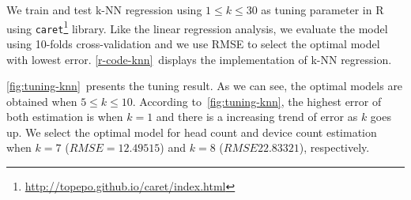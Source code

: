 	We train and test \ac{k-NN} regression using $1 \le k \le 30$ as tuning parameter in R using \verb|caret|\footnote{\url{http://topepo.github.io/caret/index.html}} library. Like the linear regression analysis, we evaluate the model using 10-folds cross-validation and we use \ac{RMSE} to select the optimal model with lowest error. \autoref{r-code-knn}~displays the implementation of \ac{k-NN} regression.

	\autoref{fig:tuning-knn}~presents the tuning result. As we can see, the optimal models are obtained when $5 \le k \le 10$. According to~\autoref{fig:tuning-knn}, the highest error of both estimation is when $k=1$ and there is a increasing trend of error as $k$ goes up. We select the optimal model for head count and device count estimation when $k=7$ ($RMSE=12.49515$) and $k=8$ ($RMSE22.83321$), respectively.









